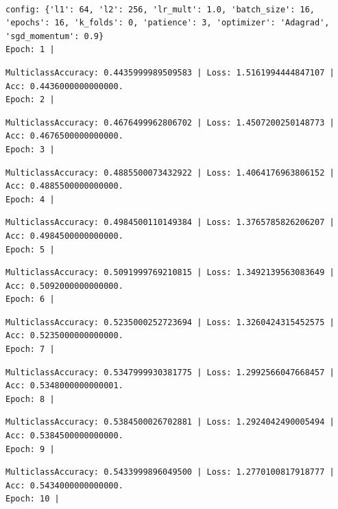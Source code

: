 \documentclass[
  letterpaper,
  DIV=11,
  numbers=noendperiod]{scrreprt}
\begin{document}
\begin{verbatim}

config: {'l1': 64, 'l2': 256, 'lr_mult': 1.0, 'batch_size': 16, 'epochs': 16, 'k_folds': 0, 'patience': 3, 'optimizer': 'Adagrad', 'sgd_momentum': 0.9}
Epoch: 1 | 
\end{verbatim}

\begin{verbatim}
MulticlassAccuracy: 0.4435999989509583 | Loss: 1.5161994444847107 | Acc: 0.4436000000000000.
Epoch: 2 | 
\end{verbatim}

\begin{verbatim}
MulticlassAccuracy: 0.4676499962806702 | Loss: 1.4507200250148773 | Acc: 0.4676500000000000.
Epoch: 3 | 
\end{verbatim}

\begin{verbatim}
MulticlassAccuracy: 0.4885500073432922 | Loss: 1.4064176963806152 | Acc: 0.4885500000000000.
Epoch: 4 | 
\end{verbatim}

\begin{verbatim}
MulticlassAccuracy: 0.4984500110149384 | Loss: 1.3765785826206207 | Acc: 0.4984500000000000.
Epoch: 5 | 
\end{verbatim}

\begin{verbatim}
MulticlassAccuracy: 0.5091999769210815 | Loss: 1.3492139563083649 | Acc: 0.5092000000000000.
Epoch: 6 | 
\end{verbatim}

\begin{verbatim}
MulticlassAccuracy: 0.5235000252723694 | Loss: 1.3260424315452575 | Acc: 0.5235000000000000.
Epoch: 7 | 
\end{verbatim}

\begin{verbatim}
MulticlassAccuracy: 0.5347999930381775 | Loss: 1.2992566047668457 | Acc: 0.5348000000000001.
Epoch: 8 | 
\end{verbatim}

\begin{verbatim}
MulticlassAccuracy: 0.5384500026702881 | Loss: 1.2924042490005494 | Acc: 0.5384500000000000.
Epoch: 9 | 
\end{verbatim}

\begin{verbatim}
MulticlassAccuracy: 0.5433999896049500 | Loss: 1.2770100817918777 | Acc: 0.5434000000000000.
Epoch: 10 | 
\end{verbatim}
\end{document}
